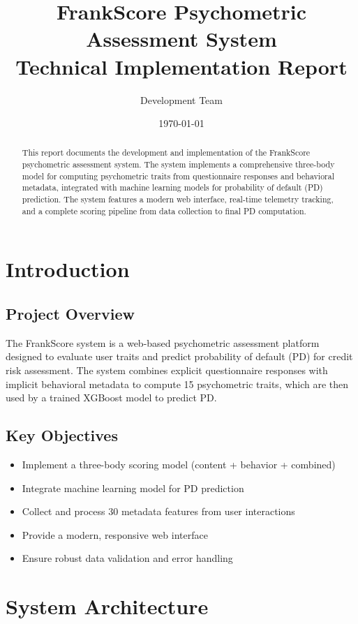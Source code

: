 \documentclass[11pt,a4paper]{article}
\title{\textbf{FrankScore Psychometric Assessment System}\\
\large Technical Implementation Report}
\author{Development Team}
\date{\today}
\begin{document}
\maketitle

\begin{abstract}
This report documents the development and implementation of the FrankScore psychometric assessment system. The system implements a comprehensive three-body model for computing psychometric traits from questionnaire responses and behavioral metadata, integrated with machine learning models for probability of default (PD) prediction. The system features a modern web interface, real-time telemetry tracking, and a complete scoring pipeline from data collection to final PD computation.
\end{abstract}

\tableofcontents
\newpage

\section{Introduction}

\subsection{Project Overview}
The FrankScore system is a web-based psychometric assessment platform designed to evaluate user traits and predict probability of default (PD) for credit risk assessment. The system combines explicit questionnaire responses with implicit behavioral metadata to compute 15 psychometric traits, which are then used by a trained XGBoost model to predict PD.

\subsection{Key Objectives}
\begin{itemize}
    \item Implement a three-body scoring model (content + behavior + combined)
    \item Integrate machine learning model for PD prediction
    \item Collect and process 30 metadata features from user interactions
    \item Provide a modern, responsive web interface
    \item Ensure robust data validation and error handling
\end{itemize}

\section{System Architecture}
\end{document}
